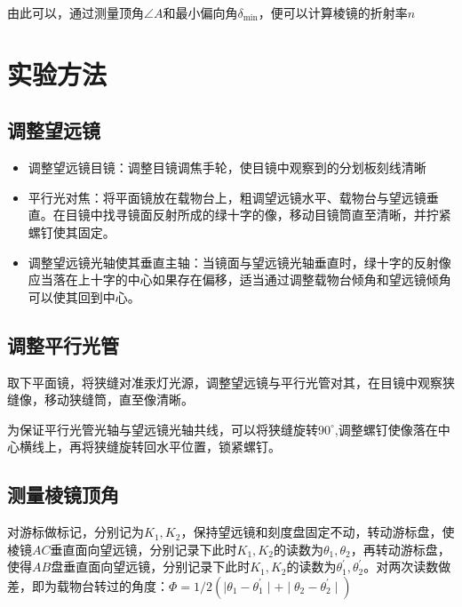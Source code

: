 \documentclass[a4paper]{ltxdoc}
\begin{document}
\begin{multicols}{2}
    \smallskip
    由此可以，通过测量顶角$\angle A$和最小偏向角$\delta_{\min}$，便可以计算棱镜的折射率$n$

    \section{实验方法}

    \subsection{调整望远镜}
    \begin{itemize}
        \item  调整望远镜目镜：调整目镜调焦手轮，使目镜中观察到的分划板刻线清晰
        \item  平行光对焦：将平面镜放在载物台上，粗调望远镜水平、载物台与望远镜垂直。在目镜中找寻镜面反射所成的绿十字的像，移动目镜筒直至清晰，并拧紧螺钉使其固定。
        \item  调整望远镜光轴使其垂直主轴：当镜面与望远镜光轴垂直时，绿十字的反射像应当落在上十字的中心如果存在偏移，适当通过调整载物台倾角和望远镜倾角可以使其回到中心。
    \end{itemize}

    \subsection{调整平行光管}

    取下平面镜，将狭缝对准汞灯光源，调整望远镜与平行光管对其，在目镜中观察狭缝像，移动狭缝筒，直至像清晰。

    为保证平行光管光轴与望远镜光轴共线，可以将狭缝旋转$90^{\circ}$,调整螺钉使像落在中心横线上，再将狭缝旋转回水平位置，锁紧螺钉。

    \subsection{测量棱镜顶角}

    对游标做标记，分别记为$K_1,K_2$，保持望远镜和刻度盘固定不动，转动游标盘，使棱镜$AC$垂直面向望远镜，分别记录下此时$K_1,K_2$的读数为$\theta_1, \theta_2$，再转动游标盘，使得$AB$盘垂直面向望远镜，分别记录下此时$K_1,K_2$的读数为$\theta_1^{\prime}, \theta_2^{\prime}$。对两次读数做差，即为载物台转过的角度：$\Phi = 1/2 (\mid \theta_1 - \theta_1^{\prime}\mid + \mid \theta_2 - \theta_2^{\prime}\mid)$


\end{multicols}
\end{document}
